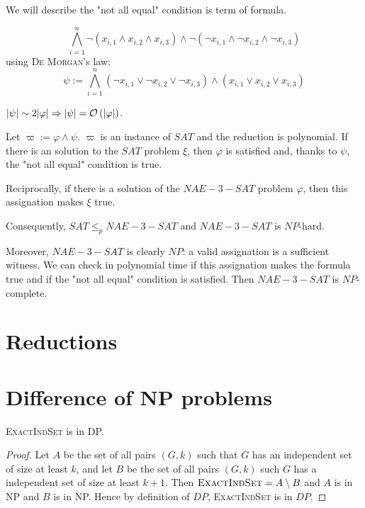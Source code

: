 We will describe the "not all equal" condition is term of formula.

$$
    \bigwedge\limits_{i=1}^n \neg(x_{i,1} \wedge x_{i,2} \wedge x_{i,3}) \wedge \neg(\neg x_{i,1} \wedge \neg x_{i,2} \wedge \neg x_{i,3})
$$
using \textsc{De Morgan}'s law:
$$
    \psi:=\bigwedge\limits_{i=1}^n (\neg x_{i,1} \vee \neg x_{i,2} \vee \neg x_{i,3}) \wedge (x_{i,1} \vee x_{i,2} \vee x_{i,3})
$$

$\vert \psi\vert \sim 2\vert \varphi \vert \Rightarrow \vert \psi \vert = \mathcal O \left( \vert\varphi\vert \right)$. 

Let $\varpi := \varphi \wedge \psi$. $\varpi$ is an instance of $SAT$ and the reduction is polynomial. If there is an solution to the $SAT$ problem $\xi$, then $\varphi$ is satisfied and, thanks to $\psi$, the "not all equal" condition is true.

Reciprocally, if there is a solution of the $NAE-3-SAT$ problem $\varphi$, then this assignation makes $\xi$ true.

Consequently, $SAT \leqslant_p NAE-3-SAT$ and $NAE-3-SAT$ is $NP$-hard. 

Moreover, $NAE-3-SAT$ is clearly $NP$: a valid assignation is a sufficient witness. We can check in polynomial time if this assignation makes the formula true and if the "not all equal" condition is satisfied. Then $NAE-3-SAT$ is $NP$-complete.

\section{Reductions}

\section{Difference of NP problems}

\begin{propo}\label{3:1}
    \textsc{ExactIndSet} is in DP.
\end{propo}
\begin{proof}
    Let $A$ be the set of all pairs $(G, k)$ such that $G$ has an independent set of size at least $k$, and let $B$ be the set of all pairs $(G, k)$ such $G$ has a independent set of size at least $k+1$. Then $\textsc{ExactIndSet}=A \setminus B$ and $A$ is in NP and $B$ is in NP. Hence by definition of $DP$, \textsc{ExactIndSet} is in $DP$.
\end{proof}

